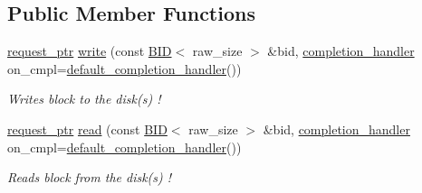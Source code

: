 \subsection*{Public Member Functions}
\begin{CompactItemize}
\item 
\hyperlink{classrequest__ptr}{request\_\-ptr} \hyperlink{group__mnglayer_gc9c8caa89ae04a3b8dc3d1793eda61b0}{write} (const \hyperlink{structBID}{BID}$<$ raw\_\-size $>$ \&bid, \hyperlink{classcompletion__handler}{completion\_\-handler} on\_\-cmpl=\hyperlink{structdefault__completion__handler}{default\_\-completion\_\-handler}())
\begin{CompactList}\small\item\em Writes block to the disk(s) ! \item\end{CompactList}\item 
\hyperlink{classrequest__ptr}{request\_\-ptr} \hyperlink{group__mnglayer_ge5f58b3358b383d44832ce0fbef7e015}{read} (const \hyperlink{structBID}{BID}$<$ raw\_\-size $>$ \&bid, \hyperlink{classcompletion__handler}{completion\_\-handler} on\_\-cmpl=\hyperlink{structdefault__completion__handler}{default\_\-completion\_\-handler}())
\begin{CompactList}\small\item\em Reads block from the disk(s) ! \item\end{CompactList}\end{CompactItemize}
